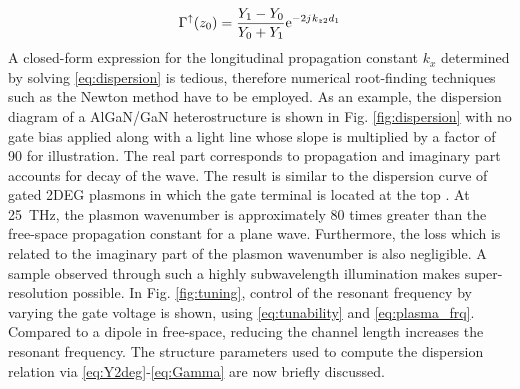%
\begin{equation}
  \Gamma^{\uparrow}(z_0) = \frac{Y_1 - Y_0}{Y_0 + Y_1} \mathrm{e}^{-2{j}\mkern1mu k_{z2}d_1}
  \label{eq:Gamma}
\end{equation}
%
A closed-form expression for the longitudinal propagation constant $k_x$ determined by solving \eqref{eq:dispersion} is tedious, therefore numerical root-finding techniques such as the Newton method \cite{Press2007} have to be employed. As an example, the dispersion diagram of a AlGaN/GaN heterostructure is shown in Fig. \ref{fig:dispersion} with no gate bias applied along with a light line whose slope is multiplied by a factor of 90 for illustration. The real part corresponds to propagation and imaginary part accounts for decay of the wave. The result is similar to the dispersion curve of gated 2DEG plasmons in which the gate terminal is located at the top \cite{Nakayama1974, Eguiluz1975}. At \SI{25}{\THz}, the plasmon wavenumber is approximately 80 times greater than the free-space propagation constant for a plane wave. Furthermore, the loss which is related to the imaginary part of the plasmon wavenumber is also negligible. A sample observed through such a highly subwavelength illumination makes
super-resolution possible. In Fig. \ref{fig:tuning}, control of the resonant frequency by varying the gate voltage is shown, using \eqref{eq:tunability} and \eqref{eq:plasma_frq}. Compared to a dipole in free-space, reducing the channel length increases the resonant frequency. The structure parameters used to compute the
dispersion relation via \eqref{eq:Y2deg}-\eqref{eq:Gamma} are now briefly discussed.

